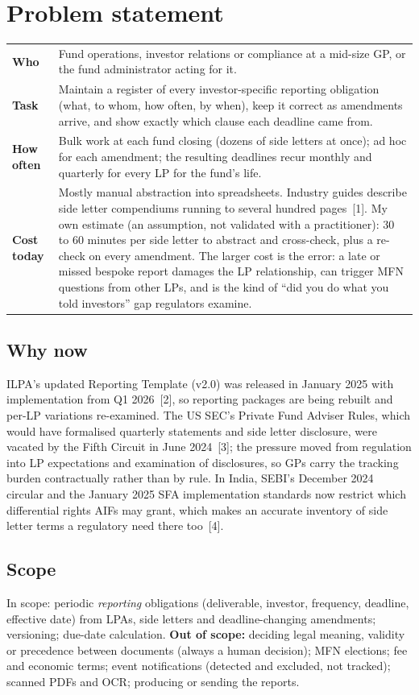 \documentclass[10pt,a4paper]{article}
\begin{document}
\section{Problem statement}
\begin{tabularx}{\linewidth}{@{}p{2.1cm}L@{}}
\toprule
\textbf{Who} & Fund operations, investor relations or compliance at a mid-size GP, or the fund administrator acting for it.\\
\textbf{Task} & Maintain a register of every investor-specific reporting obligation (what, to whom, how often, by when), keep it correct as amendments arrive, and show exactly which clause each deadline came from.\\
\textbf{How often} & Bulk work at each fund closing (dozens of side letters at once); ad hoc for each amendment; the resulting deadlines recur monthly and quarterly for every LP for the fund's life.\\
\textbf{Cost today} & Mostly manual abstraction into spreadsheets. Industry guides describe side letter compendiums running to several hundred pages~[1]. My own estimate (an assumption, not validated with a practitioner): 30 to 60 minutes per side letter to abstract and cross-check, plus a re-check on every amendment. The larger cost is the error: a late or missed bespoke report damages the LP relationship, can trigger MFN questions from other LPs, and is the kind of ``did you do what you told investors'' gap regulators examine.\\
\bottomrule
\end{tabularx}

\subsection{Why now}
ILPA's updated Reporting Template (v2.0) was released in January 2025 with implementation from Q1 2026~[2], so reporting packages are being rebuilt and per-LP variations re-examined. The US SEC's Private Fund Adviser Rules, which would have formalised quarterly statements and side letter disclosure, were vacated by the Fifth Circuit in June 2024~[3]; the pressure moved from regulation into LP expectations and examination of disclosures, so GPs carry the tracking burden contractually rather than by rule. In India, SEBI's December 2024 circular and the January 2025 SFA implementation standards now restrict which differential rights AIFs may grant, which makes an accurate inventory of side letter terms a regulatory need there too~[4].

\subsection{Scope}
In scope: periodic \emph{reporting} obligations (deliverable, investor, frequency, deadline, effective date) from LPAs, side letters and deadline-changing amendments; versioning; due-date calculation. \textbf{Out of scope:} deciding legal meaning, validity or precedence between documents (always a human decision); MFN elections; fee and economic terms; event notifications (detected and excluded, not tracked); scanned PDFs and OCR; producing or sending the reports.
\end{document}
